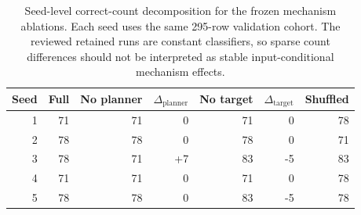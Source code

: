 
\begin{table}[t]
\centering
\caption{Seed-level correct-count decomposition for the frozen mechanism ablations. Each seed uses the same 295-row validation cohort. The reviewed retained runs are constant classifiers, so sparse count differences should not be interpreted as stable input-conditional mechanism effects.}
\label{tab:seed-level-ablation-counts}
\begin{tabular}{rrrrrrr}
\toprule
Seed & Full & No planner & $\Delta_{\mathrm{planner}}$ & No target & $\Delta_{\mathrm{target}}$ & Shuffled \\
\midrule
1 & 71 & 71 & 0 & 71 & 0 & 78 \\
2 & 78 & 78 & 0 & 78 & 0 & 71 \\
3 & 78 & 71 & +7 & 83 & -5 & 83 \\
4 & 71 & 71 & 0 & 71 & 0 & 78 \\
5 & 78 & 78 & 0 & 83 & -5 & 78 \\
\bottomrule
\end{tabular}
\end{table}

